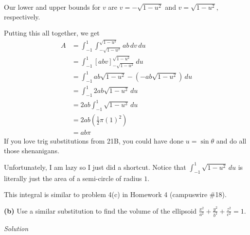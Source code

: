 \documentclass{article}
\newcommand{\lrp}[1]{\left( #1 \right)}
\newcommand{\lrb}[1]{\left[ #1 \right]}
\newcommand{\Solution}{\textit{Solution}}
\begin{document}
Our lower and upper bounds for $v$ are $v=-\sqrt{1-u^2}$ and $v=\sqrt{1-u^2}$, respectively.

Putting this all together, we get
\begin{align*}
    A&=\int_{-1}^1\int_{-\sqrt{1-u^2}}^{\sqrt{1-u^2}}ab\,dv\,du\\
    &=\int_{-1}^1\lrb{abv}_{-\sqrt{1-u^2}}^{\sqrt{1-u^2}}\,du\\
    &=\int_{-1}^1 ab\sqrt{1-u^2}-\lrp{-ab\sqrt{1-u^2}}\,du\\
    &=\int_{-1}^1 2ab\sqrt{1-u^2}\,du\\
    &=2ab\int_{-1}^1 \sqrt{1-u^2}\,du\\
    &=2ab\lrp{\frac{1}{2}\pi(1)^2}\tag{see note below}\\
    &=\boxed{ab\pi}
\end{align*}
If you love trig substitutions from 21B, you could have done $u=\sin\theta$ and do all those shenanigans. 

Unfortunately, I am lazy so I just did a shortcut. Notice that $\displaystyle \int_{-1}^1\sqrt{1-u^2}\,du$ is literally just the area of a semi-circle of radius $1$. 

This integral is similar to problem 4(c) in Homework 4 (campuswire \#18).

{}\textbf{(b)} Use a similar substitution to find the volume of the ellipsoid $\displaystyle \frac{x^2}{a^2}+\frac{y^2}{b^2}+\frac{z^2}{c^2}=1$.

\Solution
\end{document}
